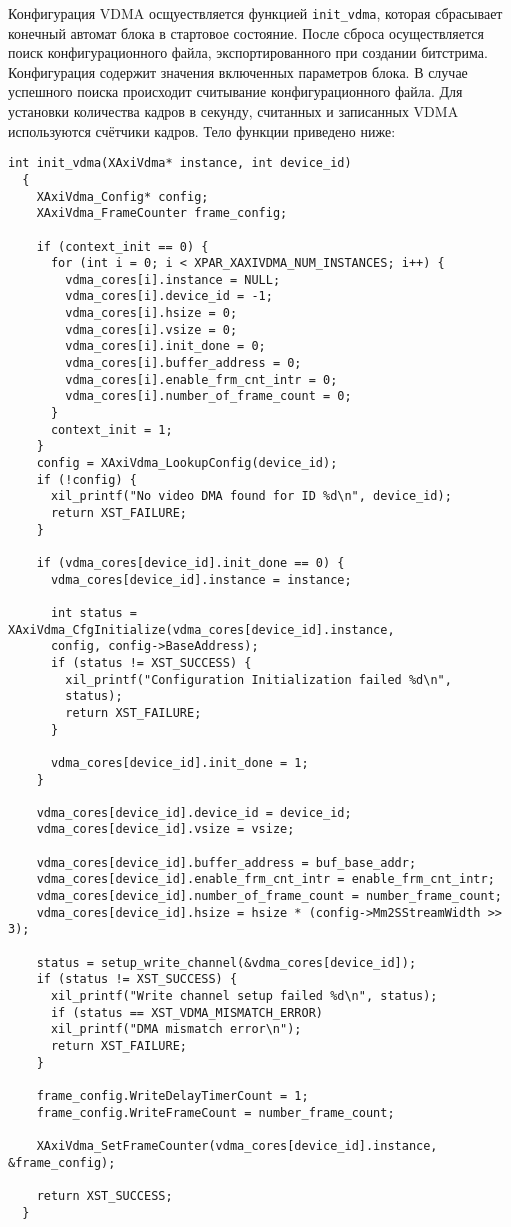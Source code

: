 Конфигурация VDMA осщуествляется функцией \texttt{init\_vdma},
которая сбрасывает конечный автомат блока в стартовое состояние. После сброса
осуществляется поиск конфигурационного файла, экспортированного при создании битстрима.
Конфигурация содержит значения включенных параметров блока. В случае успешного поиска
происходит считывание конфигурационного файла. Для установки количества кадров в секунду,
считанных и записанных VDMA используются счётчики кадров. Тело функции приведено ниже:
\medskip
\begin{lstlisting}[style=C]
  int init_vdma(XAxiVdma* instance, int device_id)
  {
    XAxiVdma_Config* config;
    XAxiVdma_FrameCounter frame_config;

    if (context_init == 0) {
      for (int i = 0; i < XPAR_XAXIVDMA_NUM_INSTANCES; i++) {
        vdma_cores[i].instance = NULL;
        vdma_cores[i].device_id = -1;
        vdma_cores[i].hsize = 0;
        vdma_cores[i].vsize = 0;
        vdma_cores[i].init_done = 0;
        vdma_cores[i].buffer_address = 0;
        vdma_cores[i].enable_frm_cnt_intr = 0;
        vdma_cores[i].number_of_frame_count = 0;
      }
      context_init = 1;
    }
    config = XAxiVdma_LookupConfig(device_id);
    if (!config) {
      xil_printf("No video DMA found for ID %d\n", device_id);
      return XST_FAILURE;
    }

    if (vdma_cores[device_id].init_done == 0) {
      vdma_cores[device_id].instance = instance;

      int status = XAxiVdma_CfgInitialize(vdma_cores[device_id].instance,
      config, config->BaseAddress);
      if (status != XST_SUCCESS) {
        xil_printf("Configuration Initialization failed %d\n",
        status);
        return XST_FAILURE;
      }

      vdma_cores[device_id].init_done = 1;
    }

    vdma_cores[device_id].device_id = device_id;
    vdma_cores[device_id].vsize = vsize;

    vdma_cores[device_id].buffer_address = buf_base_addr;
    vdma_cores[device_id].enable_frm_cnt_intr = enable_frm_cnt_intr;
    vdma_cores[device_id].number_of_frame_count = number_frame_count;
    vdma_cores[device_id].hsize = hsize * (config->Mm2SStreamWidth >> 3);

    status = setup_write_channel(&vdma_cores[device_id]);
    if (status != XST_SUCCESS) {
      xil_printf("Write channel setup failed %d\n", status);
      if (status == XST_VDMA_MISMATCH_ERROR)
      xil_printf("DMA mismatch error\n");
      return XST_FAILURE;
    }

    frame_config.WriteDelayTimerCount = 1;
    frame_config.WriteFrameCount = number_frame_count;

    XAxiVdma_SetFrameCounter(vdma_cores[device_id].instance, &frame_config);

    return XST_SUCCESS;
  }
\end{lstlisting}
\medskip


